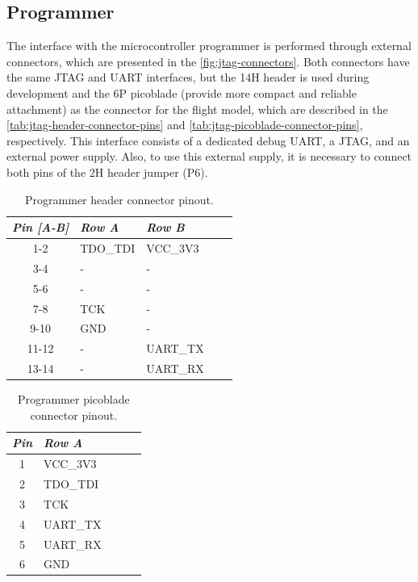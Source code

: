 \subsection{Programmer}

The interface with the microcontroller programmer is performed through external connectors, which are presented in the \autoref{fig:jtag-connectors}. Both connectors have the same JTAG and UART interfaces, but the 14H header is used during development and the 6P picoblade (provide more compact and reliable attachment) as the connector for the flight model, which are described in the \autoref{tab:jtag-header-connector-pins} and \autoref{tab:jtag-picoblade-connector-pins}, respectively. This interface consists of a dedicated debug UART, a JTAG, and an external power supply. Also, to use this external supply, it is necessary to connect both pins of the 2H header jumper (P6).

\begin{table}[!h]
    \centering
    \begin{tabular}{cllll}
        \toprule[1.5pt]
        \textit{Pin [A-B]} & \textit{Row A} & \textit{Row B} \\
        \midrule
        1-2                & TDO\_TDI       & VCC\_3V3       \\
        3-4                & -              & -              \\
        5-6                & -              & -              \\
        7-8                & TCK            & -              \\
        9-10               & GND            & -              \\
        11-12              & -              & UART\_TX       \\
        13-14              & -              & UART\_RX       \\
        \bottomrule[1.5pt]
    \end{tabular}
    \caption{Programmer header connector pinout.}
    \label{tab:jtag-header-connector-pins}
\end{table}

\begin{table}[!h]
    \centering
    \begin{tabular}{cllll}
        \toprule[1.5pt]
        \textit{Pin} & \textit{Row A} \\
        \midrule
        1            & VCC\_3V3       \\
        2            & TDO\_TDI       \\
        3            & TCK            \\
        4            & UART\_TX       \\
        5            & UART\_RX       \\
        6            & GND            \\
        \bottomrule[1.5pt]
    \end{tabular}
    \caption{Programmer picoblade connector pinout.}
    \label{tab:jtag-picoblade-connector-pins}
\end{table}

